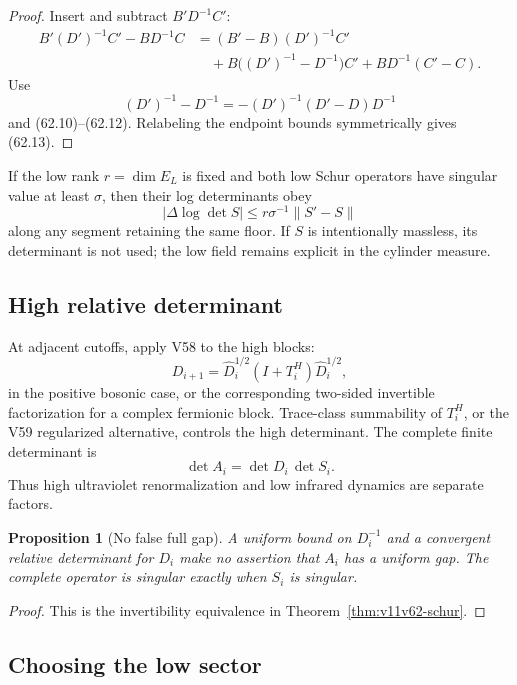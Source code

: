 \documentclass[11pt]{article}
\newtheorem{proposition}[theorem]{Proposition}
\begin{document}
\begin{proof}
Insert and subtract \(B'D^{-1}C'\):
\[
\begin{split}
 B'(D')^{-1}C'-BD^{-1}C
 &=(B'-B)(D')^{-1}C'\\
 &\quad+B\bigl((D')^{-1}-D^{-1}\bigr)C'
       +BD^{-1}(C'-C).
\end{split}
\]
Use
\[
              (D')^{-1}-D^{-1}=-(D')^{-1}(D'-D)D^{-1}
\]
and (62.10)--(62.12).  Relabeling the endpoint bounds symmetrically
gives (62.13).
\end{proof}

If the low rank \(r=\dim E_L\) is fixed and both low Schur operators
have singular value at least \(\sigma\), then their log determinants
obey
\[
                   |\Delta\log\det S|
          \le r\sigma^{-1}\lVert S'-S\rVert                  \tag{62.14}
\]
along any segment retaining the same floor.  If \(S\) is intentionally
massless, its determinant is not used; the low field remains explicit
in the cylinder measure.

\subsection{High relative determinant}

At adjacent cutoffs, apply V58 to the high blocks:
\[
 D_{i+1}
 =\widehat D_i^{1/2}(I+T_i^H)\widehat D_i^{1/2},              \tag{62.15}
\]
in the positive bosonic case, or the corresponding two-sided
invertible factorization for a complex fermionic block.  Trace-class
summability of \(T_i^H\), or the V59 regularized alternative, controls
the high determinant.  The complete finite determinant is
\[
                         \det A_i=\det D_i\,\det S_i.          \tag{62.16}
\]
Thus high ultraviolet renormalization and low infrared dynamics are
separate factors.

\begin{proposition}[No false full gap]
\label{prop:v11v62-no-false-gap}
A uniform bound on \(D_i^{-1}\) and a convergent relative determinant
for \(D_i\) make no assertion that \(A_i\) has a uniform gap.
The complete operator is singular exactly when \(S_i\) is singular.
\end{proposition}

\begin{proof}
This is the invertibility equivalence in
Theorem~\ref{thm:v11v62-schur}.
\end{proof}

\subsection{Choosing the low sector}
\end{document}
